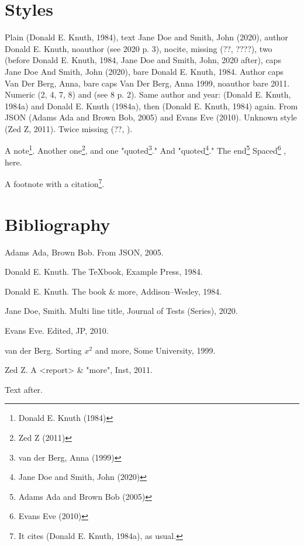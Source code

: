 \section{Styles}
\label{sec:org3028fdc}
Plain (Donald E. Knuth, 1984), text Jane Doe and Smith, John (2020), author Donald E. Knuth,
noauthor (see 2020 p. 3), nocite, missing (??, ????),
two (before Donald E. Knuth, 1984,  Jane Doe and Smith, John, 2020 after), caps Jane Doe And Smith, John (2020), bare Donald E. Knuth, 1984.
Author caps Van Der Berg, Anna, bare caps Van Der Berg, Anna 1999, noauthor bare 2011.
Numeric (2, 4, 7, 8) and (see 8 p. 2).
Same author and year: (Donald E. Knuth, 1984a) and Donald E. Knuth (1984a), then (Donald E. Knuth, 1984) again.
From JSON (Adams Ada and Brown Bob, 2005) and Evans Eve (2010).
Unknown style (Zed Z, 2011).  Twice missing (??, ).

A note\footnote{Donald E. Knuth (1984)}. Another one\footnote{Zed Z (2011)}, and one "quoted\footnote{van der Berg, Anna (1999)}."
And "quoted\footnote{Jane Doe and Smith, John (2020)}." The end\footnote{Adams Ada and Brown Bob (2005)}
Spaced\footnote{Evans Eve (2010)} , here.

A footnote with a citation\footnote{It cites (Donald E. Knuth, 1984a), as usual.}.
\section{Bibliography}
\label{sec:org0af2b60}
\noindent
Adams Ada, Brown Bob. From JSON, 2005.

\noindent
Donald E. Knuth. The {\TeX}book, Example Press, 1984.

\noindent
Donald E. Knuth. The \METAFONT book \& more, Addison--Wesley, 1984.

\noindent
Jane Doe, Smith. Multi line title, Journal of Tests (Series), 2020.

\noindent
Evans Eve. Edited, JP, 2010.

\noindent
van der Berg. Sorting $x^2$ and \alpha{} more, Some University, 1999.

\noindent
Zed Z. A <report> & "more", Inst, 2011.

Text after.
